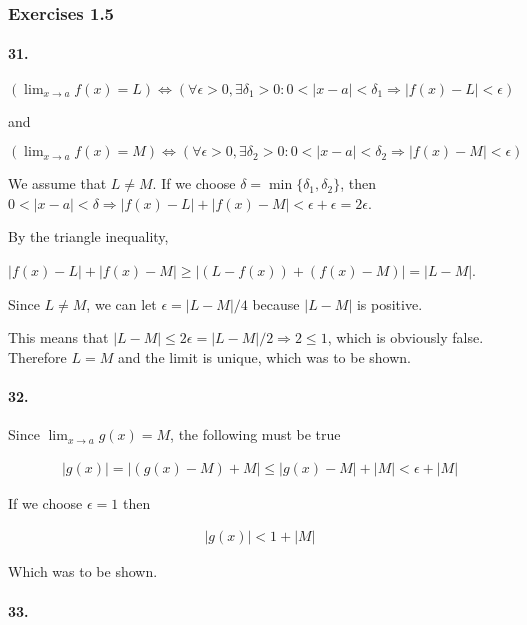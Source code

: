 \newpage
\subsubsection{Exercises 1.5}

\paragraph{31.}

$(\lim_{x\rightarrow a} f(x) = L) \Leftrightarrow (\forall \epsilon > 0, \exists \delta_1 > 0 : 0<|x-a|<\delta_1 \Rightarrow |f(x)-L|<\epsilon)$

and 

$(\lim_{x\rightarrow a} f(x) = M) \Leftrightarrow (\forall \epsilon > 0, \exists \delta_2 > 0 : 0<|x-a|<\delta_2 \Rightarrow |f(x)-M|<\epsilon)$

We assume that $L \neq M$. If we choose $\delta = \min\{\delta_1, \delta_2\}$, then $0<|x-a|<\delta \Rightarrow |f(x)-L| + |f(x)-M| < \epsilon + \epsilon = 2\epsilon$. 

By the triangle inequality,

$|f(x)-L| + |f(x)-M| \geq |(L-f(x)) + (f(x)-M)| = |L-M|$.

Since $L \neq M$, we can let $\epsilon = |L-M|/4$ because $|L-M|$ is positive.

This means that $|L-M| \leq 2\epsilon = |L-M|/2 \Rightarrow 2 \leq 1$, which is obviously false. Therefore $L = M$ and the limit is unique, which was to be shown.

\newpage
\paragraph{32.}

Since $\lim_{x\rightarrow a} g(x) = M$, the following must be true

\begin{align*}
	|g(x)| = |(g(x)-M)+M| \leq |g(x)-M|+|M| < \epsilon + |M|
\end{align*}

If we choose $\epsilon = 1$ then

\begin{align*}
	|g(x)| < 1 + |M|
\end{align*}

Which was to be shown.

\paragraph{33.}

